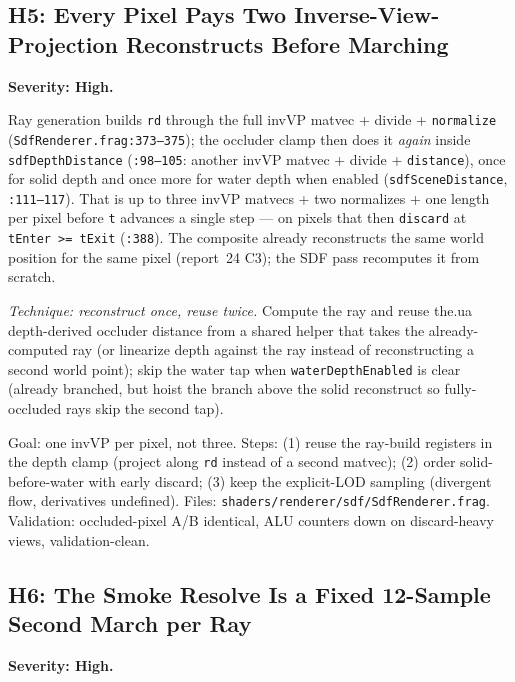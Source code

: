 \documentclass[11pt,a4paper]{article}
\begin{document}
\subsection{H5: Every Pixel Pays Two Inverse-View-Projection Reconstructs Before Marching}

\textbf{Severity: High.}

Ray generation builds \texttt{rd} through the full invVP matvec + divide +
\texttt{normalize} (\texttt{SdfRenderer.frag:373--375}); the occluder clamp
then does it \emph{again} inside \texttt{sdfDepthDistance}
(\texttt{:98--105}: another invVP matvec + divide + \texttt{distance}), once
for solid depth and once more for water depth when enabled
(\texttt{sdfSceneDistance}, \texttt{:111--117}). That is up to three invVP
matvecs + two normalizes + one length per pixel before \texttt{t} advances a
single step --- on pixels that then \texttt{discard} at \texttt{tEnter >=
tExit} (\texttt{:388}). The composite already reconstructs the same world
position for the same pixel (report~24 C3); the SDF pass recomputes it from
scratch.

\textit{Technique: reconstruct once, reuse twice.} Compute the ray and reuse
the.ua depth-derived occluder distance from a shared helper that takes the
already-computed ray (or linearize depth against the ray instead of
reconstructing a second world point); skip the water tap when
\texttt{waterDepthEnabled} is clear (already branched, but hoist the branch
above the solid reconstruct so fully-occluded rays skip the second tap).

\begin{tcolorbox}[promptbox={Prompt --- H5: single-reconstruct occluder clamp}]
Goal: one invVP per pixel, not three. Steps: (1) reuse the ray-build
registers in the depth clamp (project along \texttt{rd} instead of a second
matvec); (2) order solid-before-water with early discard; (3) keep the
explicit-LOD sampling (divergent flow, derivatives undefined). Files:
\texttt{shaders/renderer/sdf/SdfRenderer.frag}. Validation: occluded-pixel
A/B identical, ALU counters down on discard-heavy views, validation-clean.
\end{tcolorbox}

\subsection{H6: The Smoke Resolve Is a Fixed 12-Sample Second March per Ray}

\textbf{Severity: High.}
\end{document}

